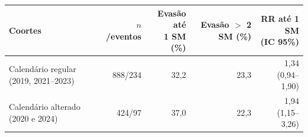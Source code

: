 \begin{tabular}{lrrrr}
\toprule
Coortes & $n$/eventos & \makecell[r]{Evasão até\\1 SM (\%)} & \makecell[r]{Evasão\\$>$ 2 SM (\%)} & \makecell[r]{RR até 1 SM\\(IC 95\%)} \\
\midrule
Calendário regular (2019, 2021--2023) & 888/234 & 32,2 & 23,3 & 1,34 (0,94--1,90) \\
Calendário alterado (2020 e 2024) & 424/97 & 37,0 & 22,3 & 1,94 (1,15--3,26) \\
\bottomrule
\end{tabular}
